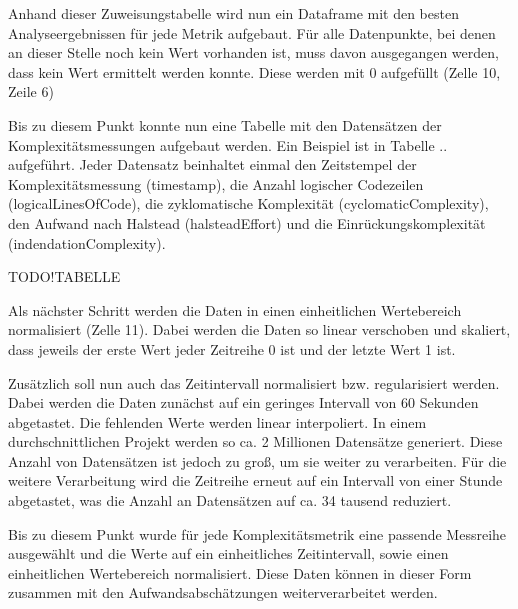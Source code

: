 \lstset{style=pythonStyle}


Anhand dieser Zuweisungstabelle wird nun ein Dataframe mit den besten
Analyseergebnissen für jede Metrik aufgebaut. Für alle Datenpunkte, bei
denen an dieser Stelle noch kein Wert vorhanden ist, muss davon
ausgegangen werden, dass kein Wert ermittelt werden konnte. Diese werden
mit 0 aufgefüllt (Zelle 10, Zeile 6)

\lstset{style=pythonStyle}


Bis zu diesem Punkt konnte nun eine Tabelle mit den Datensätzen der
Komplexitätsmessungen aufgebaut werden. Ein Beispiel ist in Tabelle ..
aufgeführt. Jeder Datensatz beinhaltet einmal den Zeitstempel der
Komplexitätsmessung (timestamp), die Anzahl logischer Codezeilen
(logicalLinesOfCode), die zyklomatische Komplexität
(cyclomaticComplexity), den Aufwand nach Halstead (halsteadEffort) und
die Einrückungskomplexität (indendationComplexity).

TODO!TABELLE

Als nächster Schritt werden die Daten in einen einheitlichen
Wertebereich normalisiert (Zelle 11). Dabei werden die Daten so linear
verschoben und skaliert, dass jeweils der erste Wert jeder Zeitreihe 0
ist und der letzte Wert 1 ist.

\lstset{style=pythonStyle}


Zusätzlich soll nun auch das Zeitintervall normalisiert bzw.
regularisiert werden. Dabei werden die Daten zunächst auf ein geringes
Intervall von 60 Sekunden abgetastet. Die fehlenden Werte werden linear
interpoliert. In einem durchschnittlichen Projekt werden so ca. 2
Millionen Datensätze generiert. Diese Anzahl von Datensätzen ist jedoch
zu groß, um sie weiter zu verarbeiten. Für die weitere Verarbeitung wird
die Zeitreihe erneut auf ein Intervall von einer Stunde abgetastet, was
die Anzahl an Datensätzen auf ca. 34 tausend reduziert.

\lstset{style=pythonStyle}


Bis zu diesem Punkt wurde für jede Komplexitätsmetrik eine passende
Messreihe ausgewählt und die Werte auf ein einheitliches Zeitintervall,
sowie einen einheitlichen Wertebereich normalisiert. Diese Daten können
in dieser Form zusammen mit den Aufwandsabschätzungen weiterverarbeitet
werden.

